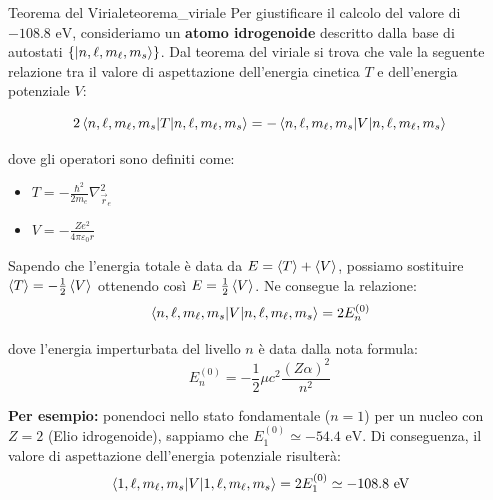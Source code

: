 \begin{note}{Teorema del Viriale}{teorema_viriale}
    Per giustificare il calcolo del valore di \(-108.8 \text{ eV}\), consideriamo un \textbf{atomo idrogenoide} descritto dalla base di autostati \( \{ \ket{n, \ell, m_\ell, m_s} \} \). 
    Dal teorema del viriale si trova che vale la seguente relazione tra il valore di aspettazione dell'energia cinetica \( T \) e dell'energia potenziale \( V \):
    
    \begin{equation}
        2 \mel{n, \ell, m_\ell, m_s}{T}{n, \ell, m_\ell, m_s} = - \mel{n, \ell, m_\ell, m_s}{V}{n, \ell, m_\ell, m_s}
    \end{equation}
    
    dove gli operatori sono definiti come:
    \begin{itemize}
        \item \( T = -\frac{\hbar^2}{2m_e} \nabla_{\vec{r}_e}^2 \)
        \item \( V = -\frac{Ze^2}{4\pi\varepsilon_0 r} \)
    \end{itemize}
    
    Sapendo che l'energia totale è data da \( E = \expval{T} + \expval{V} \), possiamo sostituire \( \expval{T} = -\frac{1}{2}\expval{V} \) ottenendo così \( E = \frac{1}{2}\expval{V} \). Ne consegue la relazione:
    \begin{equation}
        \mel{n, \ell, m_\ell, m_s}{V}{n, \ell, m_\ell, m_s} = 2 E_n^{(0)}
    \end{equation}
    
    dove l'energia imperturbata del livello \( n \) è data dalla nota formula:
    \begin{equation}
        E_n^{(0)} = -\frac{1}{2} \mu c^2 \frac{(Z\alpha)^2}{n^2}
    \end{equation}
    
    \textbf{Per esempio:} ponendoci nello stato fondamentale (\( n=1 \)) per un nucleo con \( Z=2 \) (Elio idrogenoide), sappiamo che \( E_1^{(0)} \simeq -54.4 \text{ eV} \). 
    Di conseguenza, il valore di aspettazione dell'energia potenziale risulterà:
    \begin{equation}
        \mel{1, \ell, m_\ell, m_s}{V}{1, \ell, m_\ell, m_s} = 2 E_1^{(0)} \simeq -108.8 \text{ eV}
    \end{equation}
\end{note}

